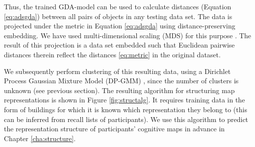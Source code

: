 Thus, the trained GDA-model can be used to calculate distances (Equation \ref{eq:adsgda}) between all pairs of objects in any testing data set. The data is projected under the metric in Equation \ref{eq:adsgda} using distance-preserving embedding. We have used multi-dimensional scaling (MDS) for this purpose \citep{borg2005modern}. The result of this projection is a data set embedded such that Euclidean pairwise distances therein reflect the distances \ref{eq:metric} in the original dataset.

We subsequently perform clustering of this resulting data, using a Dirichlet Process Gaussian Mixture Model (DP-GMM) \citep{rasmussen1999infinite}, since the number of clusters is unknown (see previous section). The resulting algorithm for structuring map representations is shown in Figure \ref{fig:structalg}. It requires training data in the form of buildings for which it is known which representation they belong to (this can be inferred from recall lists of participants). We use this algorithm to predict the representation structure of participants' cognitive maps in advance in Chapter \ref{cha:structure}.

